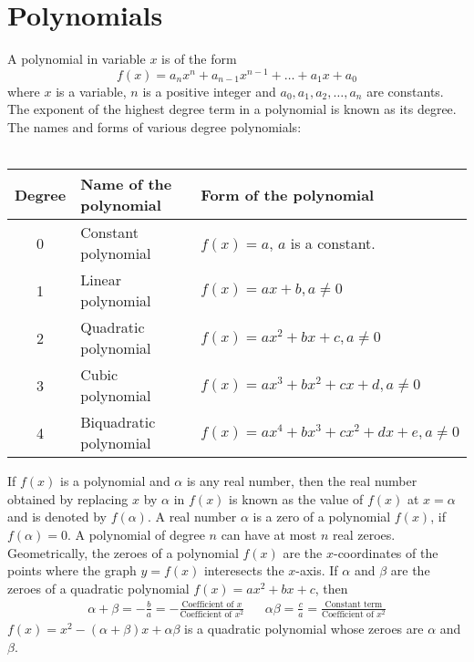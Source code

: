 \chapter{Polynomials}

\begin{outline}
    \1 A polynomial in variable $x$ is of the form $$f(x) = a_nx^n + a_{n - 1}x^{n - 1} + \dots + a_1x + a_0$$where $x$ is a variable, $n$ is a positive integer and $a_0, a_1, a_2,\dots,a_n$ are constants.
    \1 The exponent of the highest degree term in a polynomial is known as its degree.
    \1 The names and forms of various degree polynomials:\\\\
    \begin{tabular}{|c|l|l|}
        \hline
        Degree & Name of the polynomial & Form of the polynomial \\
        \hline
        0 & Constant polynomial & $f(x) = a$, $a$ is a constant. \\
        1 & Linear polynomial & $f(x) = ax + b, a \ne 0$ \\
        2 & Quadratic polynomial & $f(x) = ax^2 + bx + c, a \ne 0$ \\
        3 & Cubic polynomial & $f(x) = ax^3 + bx^2 + cx + d, a \ne 0$ \\
        4 & Biquadratic polynomial & $f(x) = ax^4 + bx^3 + cx^2 + dx + e, a \ne 0$ \\
        \hline
    \end{tabular}
    \1 If $f(x)$ is a polynomial and $\alpha$ is any real number, then the real number obtained by replacing $x$ by $\alpha$ in $f(x)$ is known as the value of $f(x)$ at $x = \alpha$ and is denoted by $f(\alpha)$.
    \1 A real number $\alpha$ is a zero of a polynomial $f(x)$, if $f(\alpha) = 0$.
    \1 A polynomial of degree $n$ can have at most $n$ real zeroes.
    \1 Geometrically, the zeroes of a polynomial $f(x)$ are the $x$-coordinates of the points where the graph $y = f(x)$ interesects the $x$-axis.
    \1 If $\alpha$ and $\beta$ are the zeroes of a quadratic polynomial $f(x) = ax^2 + bx + c$, then
    \begin{align*}
        \alpha + \beta = -\frac{b}{a} = -\frac{\text{Coefficient of }x}{\text{Coefficient of }x^2} && \alpha\beta = \frac{c}{a} = \frac{\text{Constant term}}{\text{Coefficient of }x^2} 
    \end{align*}
    \1 $f(x) = x^2 - (\alpha + \beta)x + \alpha\beta$ is a quadratic polynomial whose zeroes are $\alpha$ and $\beta$.
\end{outline}
